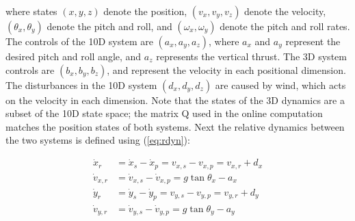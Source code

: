 where states $(x, y, z)$ denote the position, $(v_x, v_y, v_z)$ denote the velocity, $(\theta_x, \theta_y)$ denote the pitch and roll, and $(\omega_x, \omega_y)$ denote the pitch and roll rates. The controls of the 10D system are $(a_x, a_y, a_z)$, where $a_x$ and $a_y$ represent the desired pitch and roll angle, and $a_z$ represents the vertical thrust. The 3D system controls are $(b_x, b_y, b_z)$, and represent the velocity in each positional dimension. The disturbances in the 10D system $(d_x, d_y, d_z)$ are caused by wind, which acts on the velocity in each dimension. Note that the states of the 3D dynamics are a subset of the 10D state space; the matrix Q used in the online computation matches the position states of both systems. Next the relative dynamics between the two systems is defined using (\ref{eq:rdyn}):

\begin{equation}
\begin{aligned}
\dot x_r &= \dot x_s - \dot x_p = v_{x,s} - v_{x,p} = v_{x,r} + d_x\\
\dot v_{x,r} &= \dot v_{x,s} - \dot v_{x,p} = g \tan \theta_x - a_x\\
\dot y_r &= \dot y_s - \dot y_p = v_{y,s} - v_{y,p} = v_{y,r} + d_y\\
\dot v_{y,r} &= \dot v_{y,s} - \dot v_{y,p} = g \tan \theta_y - a_y\\
\end{aligned}
\end{equation}

